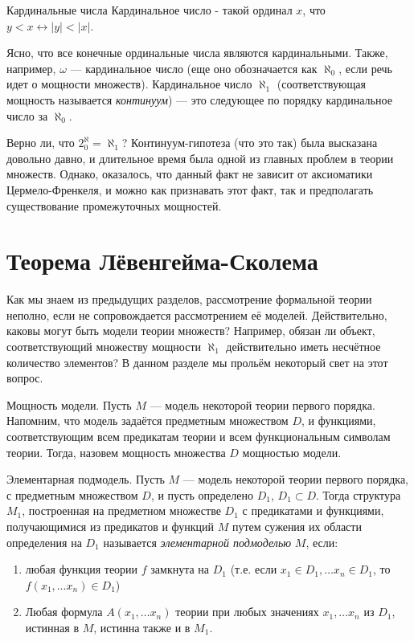 \begin{definition}{Кардинальные числа}
Кардинальное число - такой ординал $x$, что $y < x \leftrightarrow |y| < |x|$.
\end{definition}

Ясно, что все конечные ординальные числа являются кардинальными. 
Также, например, $\omega$ --- кардинальное число 
(еще оно обозначается как $\aleph_0$, если речь идет о мощности множеств).
Кардинальное число $\aleph_1$ (соответствующая мощность называется \emph{континуум}) ---
это следующее по порядку кардинальное число за $\aleph_0$.

Верно ли, что $2^\aleph_0 = \aleph_1$?
Континуум-гипотеза (что это так) была высказана
довольно давно, и длительное время была одной из главных проблем в теории множеств.
Однако, оказалось, что данный факт не зависит от аксиоматики Цермело-Френкеля, и можно
как признавать этот факт, так и предполагать существование промежуточных мощностей.

\section{Теорема Лёвенгейма-Сколема}

Как мы знаем из предыдущих разделов, рассмотрение формальной теории неполно, 
если не сопровождается рассмотрением её моделей. Действительно, каковы могут
быть модели теории множеств? Например, обязан ли объект, соответствующий
множеству мощности $\aleph_1$ действительно иметь несчётное количество
элементов? В данном разделе мы прольём некоторый свет на этот вопрос.

\begin{definition}{Мощность модели.}
Пусть $M$ --- модель некоторой теории первого порядка. Напомним, что модель
задаётся предметным множеством $D$, и функциями, соответствующим всем
предикатам теории и всем функциональным символам теории. Тогда, назовем
мощность множества $D$ мощностью модели.
\end{definition}

\begin{definition}{Элементарная подмодель.}
Пусть $M$ --- модель некоторой теории первого порядка, с предметным
множеством $D$, и пусть определено $D_1$, $D_1 \subset D$. Тогда
структура $M_1$, построенная на предметном множестве $D_1$ с предикатами
и функциями, получающимися из предикатов и функций $M$ путем сужения 
их области определения на $D_1$ называется \emph{элементарной подмоделью} $M$,
если:
\begin{enumerate}
\item любая функция теории $f$ замкнута на $D_1$ 
(т.е. если $x_1 \in D_1, \dots x_n \in D_1$, то
$f(x_1, \dots x_n) \in D_1$)
\item Любая формула $A(x_1, \dots x_n)$ теории при любых значениях
$x_1, \dots x_n$ из $D_1$, истинная в $M$, истинна также и в $M_1$.
\end{enumerate}
\end{definition}


